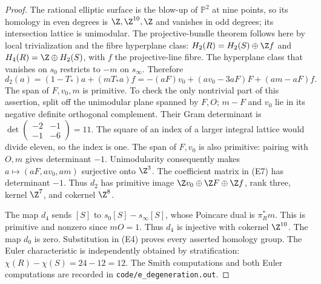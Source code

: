 \begin{proof}
The rational elliptic surface is the blow-up of $\mathbb P^2$ at nine
points, so its homology in even degrees is $\Z,\Z^{10},\Z$ and
vanishes in odd degrees; its intersection lattice is unimodular.
The projective-bundle theorem follows here by local trivialization
and the fibre hyperplane class: $H_2(R)=H_2(S)\oplus\Z f$ and
$H_4(R)=\Z\oplus H_2(S)$, with $f$ the projective-line fibre.
The hyperplane class that vanishes on $s_0$ restricts to $-m$ on
$s_\infty$. Therefore
\[
 d_2(a)=(1-T_*)a+(mT_*a)f
       =-(aF)v_0+(av_0-3aF)F+(am-aF)f.                       \tag{E7}
\]
The span of $F,v_0,m$ is primitive. To check the only nontrivial
part of this assertion, split off the unimodular plane spanned by
$F,O$; $m-F$ and $v_0$ lie in its negative definite orthogonal
complement. Their Gram determinant is
$\det\left(\begin{smallmatrix}-2&-1\\-1&-6\end{smallmatrix}\right)=11$.
The square of an index of a larger integral lattice would divide
eleven, so the index is one. The span of $F,v_0$ is also primitive:
pairing with $O,m$ gives determinant $-1$. Unimodularity consequently
makes $a\mapsto(aF,av_0,am)$ surjective onto $\Z^3$. The coefficient
matrix in (E7) has determinant $-1$. Thus $d_2$ has primitive image
$\Z v_0\oplus\Z F\oplus\Z f$, rank three, kernel $\Z^7$,
and cokernel $\Z^8$.

The map $d_4$ sends $[S]$ to $s_0[S]-s_\infty[S]$, whose Poincare
dual is $\pi_R^*m$. This is primitive and nonzero since $mO=1$.
Thus $d_4$ is injective with cokernel $\Z^{10}$. The map $d_0$ is
zero. Substitution in (E4) proves every asserted homology group.
The Euler characteristic is independently obtained by stratification:
$\chi(R)-\chi(S)=24-12=12$. The Smith computations and both Euler
computations are recorded in \texttt{code/e\_degeneration.out}.
\end{proof}

